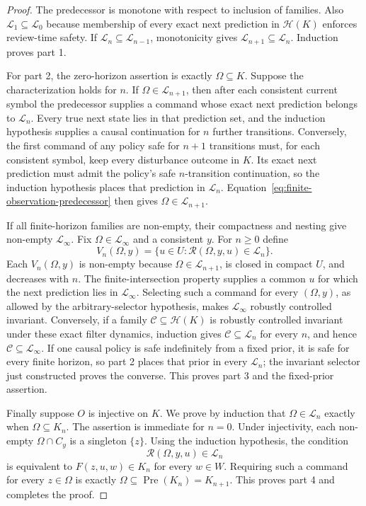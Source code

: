 \documentclass[11pt]{article}
\theoremstyle{definition}
\newcommand{\Pre}{\operatorname{Pre}}
\begin{document}
\begin{proof}
The predecessor is monotone with respect to inclusion of families. Also $\mathcal L_1\subseteq\mathcal L_0$ because membership of every exact next prediction in $\mathcal H(K)$ enforces review-time safety. If $\mathcal L_n\subseteq\mathcal L_{n-1}$, monotonicity gives $\mathcal L_{n+1}\subseteq\mathcal L_n$. Induction proves part 1.

For part 2, the zero-horizon assertion is exactly $\Omega\subseteq K$. Suppose the characterization holds for $n$. If $\Omega\in\mathcal L_{n+1}$, then after each consistent current symbol the predecessor supplies a command whose exact next prediction belongs to $\mathcal L_n$. Every true next state lies in that prediction set, and the induction hypothesis supplies a causal continuation for $n$ further transitions. Conversely, the first command of any policy safe for $n+1$ transitions must, for each consistent symbol, keep every disturbance outcome in $K$. Its exact next prediction must admit the policy's safe $n$-transition continuation, so the induction hypothesis places that prediction in $\mathcal L_n$. Equation~\eqref{eq:finite-observation-predecessor} then gives $\Omega\in\mathcal L_{n+1}$.

If all finite-horizon families are non-empty, their compactness and nesting give non-empty $\mathcal L_\infty$. Fix $\Omega\in\mathcal L_\infty$ and a consistent $y$. For $n\ge0$ define
\[
V_n(\Omega,y)=\{u\in U:\mathscr R(\Omega,y,u)\in\mathcal L_n\}.
\]
Each $V_n(\Omega,y)$ is non-empty because $\Omega\in\mathcal L_{n+1}$, is closed in compact $U$, and decreases with $n$. The finite-intersection property supplies a common $u$ for which the next prediction lies in $\mathcal L_\infty$. Selecting such a command for every $(\Omega,y)$, as allowed by the arbitrary-selector hypothesis, makes $\mathcal L_\infty$ robustly controlled invariant. Conversely, if a family $\mathcal C\subseteq\mathcal H(K)$ is robustly controlled invariant under these exact filter dynamics, induction gives $\mathcal C\subseteq\mathcal L_n$ for every $n$, and hence $\mathcal C\subseteq\mathcal L_\infty$. If one causal policy is safe indefinitely from a fixed prior, it is safe for every finite horizon, so part 2 places that prior in every $\mathcal L_n$; the invariant selector just constructed proves the converse. This proves part 3 and the fixed-prior assertion.

Finally suppose $O$ is injective on $K$. We prove by induction that $\Omega\in\mathcal L_n$ exactly when $\Omega\subseteq K_n$. The assertion is immediate for $n=0$. Under injectivity, each non-empty $\Omega\cap C_y$ is a singleton $\{z\}$. Using the induction hypothesis, the condition
\[
\mathscr R(\Omega,y,u)\in\mathcal L_n
\]
is equivalent to $F(z,u,w)\in K_n$ for every $w\in W$. Requiring such a command for every $z\in\Omega$ is exactly $\Omega\subseteq\Pre(K_n)=K_{n+1}$. This proves part 4 and completes the proof.
\end{proof}
\end{document}
